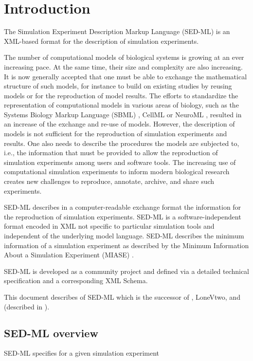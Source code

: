 \chapter{Introduction}
The Simulation Experiment Description Markup Language (SED-ML) is an XML-based format for the description of simulation experiments.

The number of computational models of biological systems is growing at an ever increasing pace. 
At the same time, their size and complexity are also increasing. It is now generally accepted that one must be able to exchange the mathematical structure of such models, for instance to build on existing studies by reusing models or for the reproduction of model results. The efforts to standardize the representation of computational models in various areas of biology, such as the Systems Biology Markup Language (SBML) \citep{Hucka:2003}, CellML \citep{cuellar:2003} or NeuroML \citep{Goddard:2001}, resulted in an increase of the exchange and re-use of models. However, the description of models is not sufficient for the reproduction of simulation experiments and results. One also needs to describe the procedures the models are subjected to, i.e., the information that must be provided to allow the reproduction of simulation experiments among users and software tools. The increasing use of computational simulation experiments to inform modern biological research creates new challenges to reproduce, annotate, archive, and share such experiments. 

SED-ML describes in a computer-readable exchange format the information for the reproduction of simulation experiments. SED-ML is a software-independent format encoded in XML not specific to particular simulation tools and independent of the underlying model language. SED-ML describes the minimum information of a simulation experiment as described by the Minimum Information About a Simulation Experiment (MIASE) \citep{Waltemath:2011}.

SED-ML is developed as a community project and defined via a detailed technical specification and a corresponding XML Schema. 

This document describes \currentLV of SED-ML which is the successor of \previousLV, LoneVtwo, and \LoneVone (described in \citep{WAB+11}).

\section{SED-ML overview}
SED-ML specifies for a given simulation experiment

